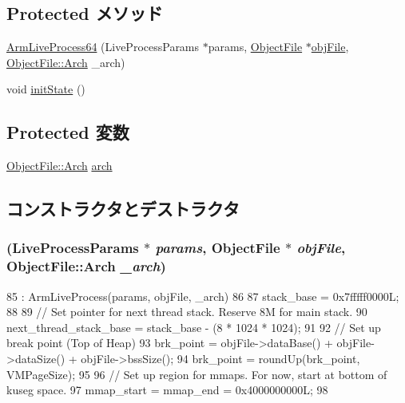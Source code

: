 \subsection*{Protected メソッド}
\begin{DoxyCompactItemize}
\item 
\hyperlink{classArmLiveProcess64_a0c3bab75fec600b830ee82eac964c03b}{ArmLiveProcess64} (LiveProcessParams $\ast$params, \hyperlink{classObjectFile}{ObjectFile} $\ast$\hyperlink{classLiveProcess_ab6cfcfa7903c66267b3e0351c3caa809}{objFile}, \hyperlink{classObjectFile_a0ac03ab06a859320a9072002bdf3aa0f}{ObjectFile::Arch} \_\-arch)
\item 
void \hyperlink{classArmLiveProcess64_a3c34ea9b29f410748d4435a667484924}{initState} ()
\end{DoxyCompactItemize}
\subsection*{Protected 変数}
\begin{DoxyCompactItemize}
\item 
\hyperlink{classObjectFile_a0ac03ab06a859320a9072002bdf3aa0f}{ObjectFile::Arch} \hyperlink{classArmLiveProcess64_abf93aa1dd69df35e2a50f63d5a5d4c40}{arch}
\end{DoxyCompactItemize}


\subsection{コンストラクタとデストラクタ}
\hypertarget{classArmLiveProcess64_a0c3bab75fec600b830ee82eac964c03b}{
\subsubsection[{ArmLiveProcess64}]{ (LiveProcessParams $\ast$ {\em params}, \/  {\bf ObjectFile} $\ast$ {\em objFile}, \/  {\bf ObjectFile::Arch} {\em \_\-arch})}}
\label{classArmLiveProcess64_a0c3bab75fec600b830ee82eac964c03b}



\begin{DoxyCode}
85     : ArmLiveProcess(params, objFile, _arch)
86 {
87     stack_base = 0x7fffff0000L;
88 
89     // Set pointer for next thread stack.  Reserve 8M for main stack.
90     next_thread_stack_base = stack_base - (8 * 1024 * 1024);
91 
92     // Set up break point (Top of Heap)
93     brk_point = objFile->dataBase() + objFile->dataSize() + objFile->bssSize();
94     brk_point = roundUp(brk_point, VMPageSize);
95 
96     // Set up region for mmaps. For now, start at bottom of kuseg space.
97     mmap_start = mmap_end = 0x4000000000L;
98 }
\end{DoxyCode}


